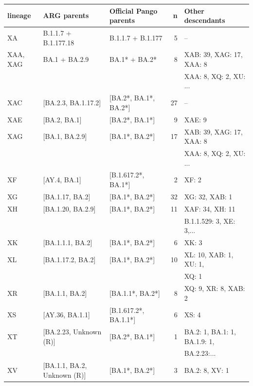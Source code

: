 \documentclass{article}
\begin{document}
\begin{table}
\begin{tabular}{lllrl}
\toprule
lineage & ARG parents & Official Pango parents & n & Other descendants \\
\midrule
XA      &       B.1.1.7 + B.1.177.18 &     B.1.1.7 + B.1.177 &   5 & -- \\
XAA, XAG     &              BA.1 + BA.2.9 &         BA.1* + BA.2* &   8 &
    XAB: 39, XAG: 17, XAA: 8 \\
    &&&&   XAA: 8, XQ: 2, XU: ... \\
XAC     &          [BA.2.3, BA.1.17.2] &  [BA.2*, BA.1*, BA.2*] &  27 & -- \\
XAE     &                 [BA.2, BA.1] &         [BA.2*, BA.1*] &   9 & XAE: 9 \\
XAG     &               [BA.1, BA.2.9] &         [BA.1*, BA.2*] &  17 &
    XAB: 39, XAG: 17, XAA: 8 \\
    &&&&   XAA: 8, XQ: 2, XU: ... \\
XF      &                 [AY.4, BA.1] &    [B.1.617.2*, BA.1*] &   2 & XF: 2 \\
XG      &              [BA.1.17, BA.2] &         [BA.1*, BA.2*] &  32 & XG: 32, XAB: 1 \\
XH      &            [BA.1.20, BA.2.9] &         [BA.1*, BA.2*] &  11 &
    XAF: 34, XH: 11 \\
&&&& B.1.1.529: 3, XE: 3,... \\
XK      &             [BA.1.1.1, BA.2] &         [BA.1*, BA.2*] &   6 & XK: 3 \\
XL      &            [BA.1.17.2, BA.2] &         [BA.1*, BA.2*] &  10 &
    XL: 10, XAB: 1, XU: 1, \\
    &&&& XQ: 1 \\
XR      &               [BA.1.1, BA.2] &       [BA.1.1*, BA.2*] &   8 &
    XQ: 9, XR: 8, XAB: 2\\
XS      &              [AY.36, BA.1.1] &  [B.1.617.2*, BA.1.1*] &   6 & XS: 4\\
XT      &       [BA.2.23, Unknown (R)] &         [BA.2*, BA.1*] &   1 &
    BA.2: 1, BA.1: 1, BA.1.9: 1, \\
    &&&& BA.2.23:... \\
XV      &  [BA.1.1, BA.2, Unknown (R)] &         [BA.1*, BA.2*] &   3 & BA.2: 8, XV: 1 \\

\end{tabular}
\end{table}
\end{document}
